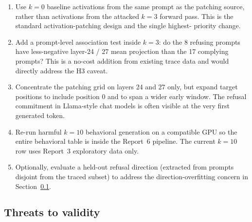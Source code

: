 \documentclass{article}
\begin{document}
\begin{enumerate}
\item Use $k=0$ baseline activations from the same prompt as the patching
  source, rather than activations from the attacked $k=3$ forward pass.
  This is the standard activation-patching design and the single highest-
  priority change.
\item Add a prompt-level association test inside $k=3$: do the 8 refusing
  prompts have less-negative layer-24 / 27 mean projection than the 17
  complying prompts? This is a no-cost addition from existing trace data
  and would directly address the H3 caveat.
\item Concentrate the patching grid on layers 24 and 27 only, but expand
  target positions to include position 0 and to span a wider early window.
  The refusal commitment in Llama-style chat models is often visible at the
  very first generated token.
\item Re-run harmful $k=10$ behavioral generation on a compatible GPU so
  the entire behavioral table is inside the Report~6 pipeline. The current
  $k=10$ row uses Report~3 exploratory data only.
\item Optionally, evaluate a held-out refusal direction (extracted from
  prompts disjoint from the traced subset) to address the direction-overfitting
  concern in Section~\ref{sec:threats}.
\end{enumerate}

\subsection{Threats to validity}
\label{sec:threats}
\end{document}
